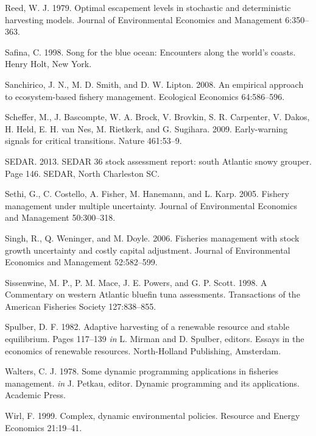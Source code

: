 \documentclass[review,12pt,author-year,titlepage]{components/elsarticle} %
\begin{document}
\begin{flushleft}
Reed, W. J. 1979. Optimal escapement levels in stochastic and
deterministic harvesting models. Journal of Environmental Economics and
Management 6:350--363.

Safina, C. 1998. Song for the blue ocean: Encounters along the world's
coasts. Henry Holt, New York.

Sanchirico, J. N., M. D. Smith, and D. W. Lipton. 2008. An empirical
approach to ecosystem-based fishery management. Ecological Economics
64:586--596.

Scheffer, M., J. Bascompte, W. A. Brock, V. Brovkin, S. R. Carpenter, V.
Dakos, H. Held, E. H. van Nes, M. Rietkerk, and G. Sugihara. 2009.
Early-warning signals for critical transitions. Nature 461:53--9.

SEDAR. 2013. SEDAR 36 stock assessment report: south Atlantic snowy
grouper. Page 146. SEDAR, North Charleston SC.

Sethi, G., C. Costello, A. Fisher, M. Hanemann, and L. Karp. 2005.
Fishery management under multiple uncertainty. Journal of Environmental
Economics and Management 50:300--318.

Singh, R., Q. Weninger, and M. Doyle. 2006. Fisheries management with
stock growth uncertainty and costly capital adjustment. Journal of
Environmental Economics and Management 52:582--599.

Sissenwine, M. P., P. M. Mace, J. E. Powers, and G. P. Scott. 1998. A
Commentary on western Atlantic bluefin tuna assessments. Transactions of
the American Fisheries Society 127:838--855.

Spulber, D. F. 1982. Adaptive harvesting of a renewable resource and
stable equilibrium. Pages 117--139 \emph{in} L. Mirman and D. Spulber,
editors. Essays in the economics of renewable resources. North-Holland
Publishing, Amsterdam.

Walters, C. J. 1978. Some dynamic programming applications in fisheries
management. \emph{in} J. Petkau, editor. Dynamic programming and its
applications. Academic Press.

Wirl, F. 1999. Complex, dynamic environmental policies. Resource and
Energy Economics 21:19--41.
\end{flushleft}
\end{document}
